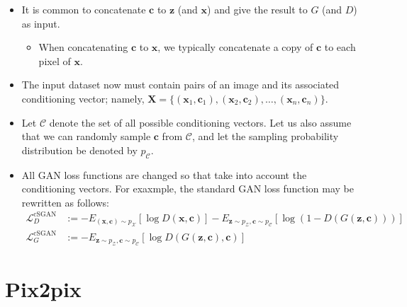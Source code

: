 \documentclass[10pt]{article}
\newcommand{\ve}[1]{\pmb{#1}}
\newcommand{\mc}[1]{\mathcal{#1}}
\begin{document}
\begin{itemize}
    \item It is common to concatenate $\ve{c}$ to $\ve{z}$ (and $\ve{x}$) and give the result to $G$ (and $D$) as input.
    \begin{itemize}
      \item When concatenating $\ve{c}$ to $\ve{x}$, we typically concatenate a copy of $\ve{c}$ to each pixel of $\ve{x}$.
    \end{itemize}

    \item The input dataset now must contain pairs of an image and its associated conditioning vector; namely, $\ve{X} = \{ (\ve{x}_1, \ve{c}_1), (\ve{x}_2, \ve{c}_2), \dotsc, (\ve{x}_n, \ve{c}_n) \}$.

    \item Let $\mathcal{C}$ denote the set of all possible conditioning vectors. Let us also assume that we can randomly sample $\ve{c}$ from $\mc{C}$, and let the sampling probability distribution be denoted by $p_{\mathcal{C}}$.

    \item All GAN loss functions are changed so that take into account the conditioning vectors. For exaxmple, the standard GAN loss function may be rewritten as follows:
    \begin{align*}
      \mathcal{L}_{D}^{\mathrm{cSGAN}} &:= - E_{(\ve{x},\ve{c}) \sim p_{\mathcal{X}}}[\log D(\ve{x}, \ve{c})] - E_{\ve{z} \sim p_{\mathcal{Z}}, \ve{c} \sim p_{\mathcal{C}}}[\log(1 - D(G(\ve{z}, \ve{c})))]\\
      \mathcal{L}_{G}^{\mathrm{cSGAN}} &:= - E_{\ve{z} \sim p_{\mathcal{Z}}, \ve{c} \sim p_{\mathcal{C}}}[\log D(G(\ve{z}, \ve{c}), \ve{c})]
    \end{align*}
  \end{itemize}

  \section{Pix2pix}
\end{document}
